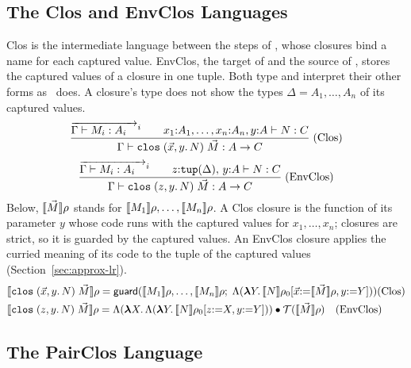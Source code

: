 \subsection{The Clos and EnvClos Languages}

Clos is the intermediate language between the steps of , whose closures bind a name for each captured value. EnvClos, the target of  and the source of , stores the captured values of a closure in one tuple. Both type and interpret their other forms as \fpc\ does.
A closure's type does not show the types $\Delta = A_1, \ldots, A_n$ of
its captured values.
{\small\figdefs
{}
\[
  \dfrac{\overrightarrow{\Gamma \vdash M_i : A_i \quad}^{i} \qquad
         x_1{:}A_1, \ldots, x_n{:}A_n, y{:}A \vdash N : C}
        {\Gamma \vdash \mathtt{clos}\;(\vec{x}, y.\,N)\;\vec{M} : A \rightarrow C}\;\text{(Clos)}
\]
\[
  \dfrac{\overrightarrow{\Gamma \vdash M_i : A_i \quad}^{i} \qquad
         z{:}\mathtt{tup}(\Delta),\, y{:}A \vdash N : C}
        {\Gamma \vdash \mathtt{clos}\;(z, y.\,N)\;\vec{M} : A \rightarrow C}\;\text{(EnvClos)}
\]
}
Below, $\llbracket \vec{M} \rrbracket\rho$ stands for $\llbracket M_1 \rrbracket\rho, \ldots, \llbracket M_n \rrbracket\rho$. A Clos closure is the function of its parameter $y$ whose code runs
with the captured values for $x_1, \ldots, x_n$; closures are strict, so
it is guarded by the captured values. An EnvClos closure applies the
curried meaning of its code to the tuple of the captured values
(Section~\ref{sec:approx-lr}).
{\small\figdefs
{}
\[
\begin{array}{@{}l@{}}
    \den{\kw{clos}\;(\vec{x}, y.\,N)\;\vec{M}}\rho =
    \mathsf{guard}(\den{M_1}\rho, \ldots, \den{M_n}\rho;\;
      \Lambda(\mlam{Y} \den{N}\rho_0[\vec{x}{:=}\den{\vec{M}}\rho, y{:=}Y]))
    \hfill \text{(Clos)}\\[4pt]
    \den{\kw{clos}\;(z, y.\,N)\;\vec{M}}\rho =
    \Lambda(\mlam{X} \Lambda(\mlam{Y} \den{N}\rho_0[z{:=}X, y{:=}Y])) \app
      \mathcal{T}(\den{\vec{M}}\rho)
    \quad \text{(EnvClos)}
\end{array}
\]
}

\subsection{The PairClos Language}

